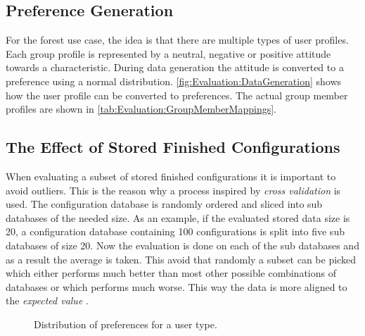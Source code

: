\subsection{Preference Generation}

For the forest use case, the idea is that there are multiple types of user profiles. Each group profile is represented by a neutral, negative or positive attitude towards a characteristic. During data generation the attitude is converted to a preference  using a normal distribution. \autoref{fig:Evaluation:DataGeneration} shows how the user profile can be converted to preferences. The actual group member profiles are shown in \autoref{tab:Evaluation:GroupMemberMappings}.

\subsection{The Effect of Stored Finished Configurations}

When evaluating a subset of stored finished configurations it is important to avoid outliers. This is the reason why a process inspired by \emph{cross validation}  is used. The configuration database is randomly ordered and sliced into sub databases of the needed size. As an example, if the evaluated stored data size is 20, a configuration database containing 100 configurations is split into five sub databases of size 20. Now the evaluation is done on each of the sub databases and as a result the average is taken. This avoid that randomly a subset can be picked which either performs much better than most other possible combinations of databases or which performs much worse. This way the data is more aligned to the \emph{expected value} .

\pgfplotsset{height=5cm,width=\textwidth,compat=1.8}
\begin{figure}
 \caption{Distribution of preferences for a user type.}
\label{fig:Evaluation:DataGeneration}
\end{figure}

